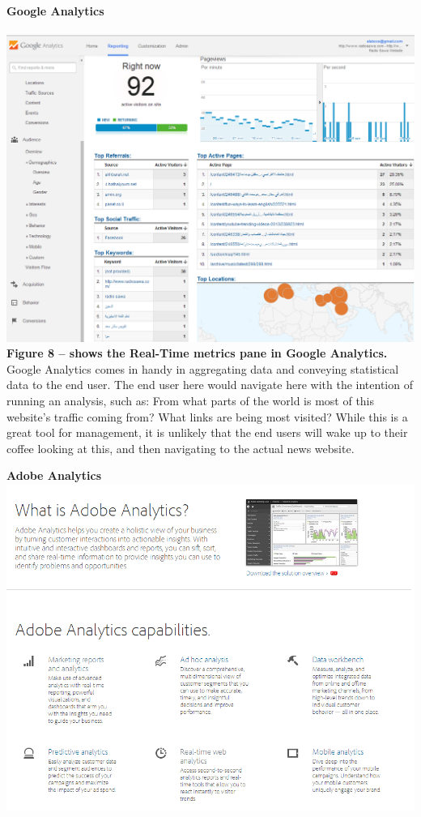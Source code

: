 \documentclass[12pt]{article}
\begin{document}
\newpage


\noindent\textbf{Google Analytics} \\ \\
\noindent\includegraphics[scale=0.4]{img/google_analytics} \\
\noindent\textbf{Figure 8 -- shows the Real-Time metrics pane in Google Analytics.} \\

Google Analytics comes in handy in aggregating data and conveying statistical data to the end user. The end user here would navigate here with the intention of running an analysis, such as: From what parts of the world is most of this website's traffic coming from? What links are being most visited?
While this is a great tool for management, it is unlikely that the end users will wake up to their coffee looking at this, and then navigating to the actual news website. \\

\newpage

\noindent\textbf{Adobe Analytics} \\
\noindent\includegraphics[scale=0.6]{img/adobe_analytics}
\end{document}
